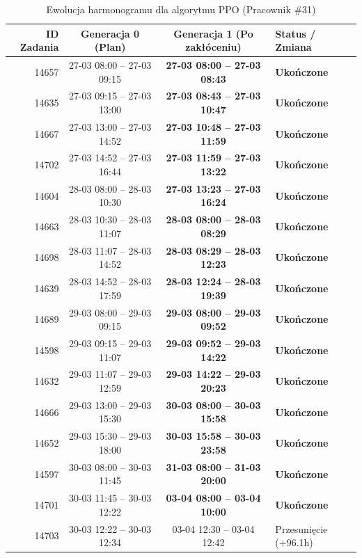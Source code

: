 \begin{table}[htbp]
\centering\small
\caption{Ewolucja harmonogramu dla algorytmu PPO (Pracownik \#31)}
\label{tab:case_study_ppo_u31}
\begin{tabular}{|r|c|c|l|}
\hline
\textbf{ID Zadania} & \textbf{Generacja 0 (Plan)} & \textbf{Generacja 1 (Po zakłóceniu)} & \textbf{Status / Zmiana} \\ \hline
14657 & 27-03 08:00 -- 27-03 09:15 & \textbf{27-03 08:00 -- 27-03 08:43} & \textbf{Ukończone} \\ 
14635 & 27-03 09:15 -- 27-03 13:00 & \textbf{27-03 08:43 -- 27-03 10:47} & \textbf{Ukończone} \\ 
14667 & 27-03 13:00 -- 27-03 14:52 & \textbf{27-03 10:48 -- 27-03 11:59} & \textbf{Ukończone} \\ 
14702 & 27-03 14:52 -- 27-03 16:44 & \textbf{27-03 11:59 -- 27-03 13:22} & \textbf{Ukończone} \\ 
14604 & 28-03 08:00 -- 28-03 10:30 & \textbf{27-03 13:23 -- 27-03 16:24} & \textbf{Ukończone} \\ 
14663 & 28-03 10:30 -- 28-03 11:07 & \textbf{28-03 08:00 -- 28-03 08:29} & \textbf{Ukończone} \\ 
14698 & 28-03 11:07 -- 28-03 14:52 & \textbf{28-03 08:29 -- 28-03 12:23} & \textbf{Ukończone} \\ 
14639 & 28-03 14:52 -- 28-03 17:59 & \textbf{28-03 12:24 -- 28-03 19:39} & \textbf{Ukończone} \\ 
14689 & 29-03 08:00 -- 29-03 09:15 & \textbf{29-03 08:00 -- 29-03 09:52} & \textbf{Ukończone} \\ 
14598 & 29-03 09:15 -- 29-03 11:07 & \textbf{29-03 09:52 -- 29-03 14:22} & \textbf{Ukończone} \\ 
14632 & 29-03 11:07 -- 29-03 12:59 & \textbf{29-03 14:22 -- 29-03 20:23} & \textbf{Ukończone} \\ 
14666 & 29-03 13:00 -- 29-03 15:30 & \textbf{30-03 08:00 -- 30-03 15:58} & \textbf{Ukończone} \\ 
14652 & 29-03 15:30 -- 29-03 18:00 & \textbf{30-03 15:58 -- 30-03 23:58} & \textbf{Ukończone} \\ 
14597 & 30-03 08:00 -- 30-03 11:45 & \textbf{31-03 08:00 -- 31-03 20:00} & \textbf{Ukończone} \\ 
14701 & 30-03 11:45 -- 30-03 12:22 & \textbf{03-04 08:00 -- 03-04 10:00} & \textbf{Ukończone} \\ 
14703 & 30-03 12:22 -- 30-03 12:34 & 03-04 12:30 -- 03-04 12:42 & Przesunięcie (+96.1h) \\ 

\end{tabular}
\end{table}
